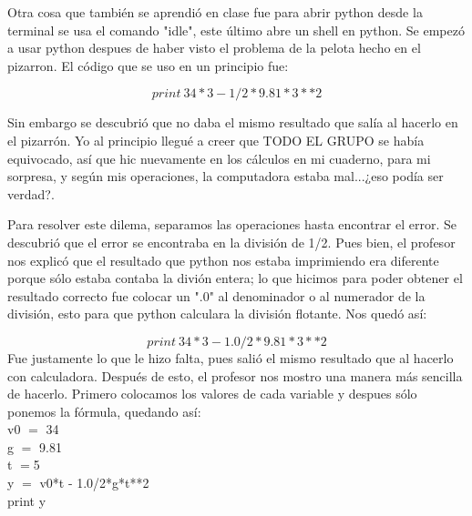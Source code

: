 \documentclass[letterpaper, 12pt,oneside]{article}
\begin{document}
	Otra cosa que también se aprendió en clase fue para abrir python desde la terminal se usa el comando "idle", este último abre un shell en python. Se empezó a usar python despues de haber visto el problema de la pelota hecho en el pizarron. El código que se uso en un principio fue:

	\[print\ 34*3-1/2*9.81*3**2\]
	
	Sin embargo se descubrió que no daba el mismo resultado que salía al hacerlo en el pizarrón. Yo al principio llegué a creer que TODO EL GRUPO se había equivocado, así que hic nuevamente en los cálculos en mi cuaderno, para mi sorpresa, y según mis operaciones, la computadora estaba mal...¿eso podía ser verdad?.
	
	Para resolver este dilema, separamos las operaciones hasta encontrar el error. Se descubrió que el error se encontraba en la división de 1/2.
	Pues bien, el profesor nos explicó que el resultado que python nos estaba imprimiendo era diferente porque sólo estaba contaba la divión entera; lo que hicimos para poder obtener el resultado correcto fue colocar un ".0" al denominador o al numerador de la división, esto para que python calculara la división flotante.
	Nos quedó así:
	
	\[print\ 34*3-1.0/2*9.81*3**2\]
	 Fue justamente lo que le hizo falta, pues salió el mismo resultado que al hacerlo con calculadora. 
	 Después de esto, el profesor nos mostro una manera más sencilla de hacerlo. Primero colocamos los valores de cada variable y despues sólo ponemos la fórmula, quedando así:\\
	v0 $ =$ 34\\
	 g $=$ 9.81\\
	 t $= $5\\
	 y $=$ v0*t - 1.0/2*g*t**2\\
	 print y\\
\end{document}
